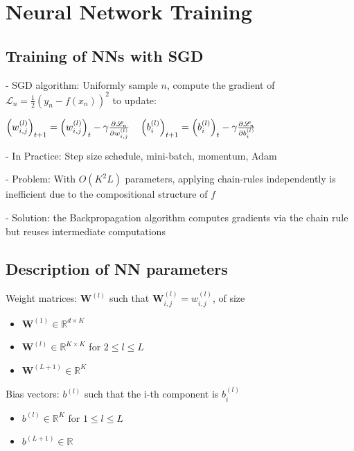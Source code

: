 
\section*{Neural Network Training}

\subsection*{Training of NNs with SGD}
- SGD algorithm: Uniformly sample $n$, compute the gradient of $\mathscr{L}_{n}=\frac{1}{2}\left(y_{n}-f\left(x_{n}\right)\right)^{2}$ to update:

$
\left(w_{i, j}^{(l)}\right)_{t+1}=\left(w_{i, j}^{(l)}\right)_{t}-\gamma \frac{\partial \mathscr{L}_{n}}{\partial w_{i, j}^{(l)}} \\\quad\left(b_{i}^{(l)}\right)_{t+1}=\left(b_{i}^{(l)}\right)_{t}-\gamma \frac{\partial \mathscr{L}_{n}}{\partial b_{i}^{(l)}}
$

- In Practice: Step size schedule, mini-batch, momentum, Adam

- Problem: With $O\left(K^{2} L\right)$ parameters, applying chain-rules independently is inefficient due to the compositional structure of $f$

- Solution: the Backpropagation algorithm computes gradients via the chain rule but reuses intermediate computations

\subsection*{Description of NN parameters}


Weight matrices: $\mathbf{W}^{(l)}$ such that $\mathbf{W}_{i, j}^{(l)}=w_{i, j}^{(l)}$, of size

\begin{itemize}
  \item $\mathbf{W}^{(1)} \in \mathbb{R}^{d \times K}$
  \item $\mathbf{W}^{(l)} \in \mathbb{R}^{K \times K}$ for $2 \leq l \leq L$
  \item $\mathbf{W}^{(L+1)} \in \mathbb{R}^{K}$
\end{itemize}

Bias vectors: $b^{(l)}$ such that the i-th component is $b_{i}^{(l)}$

\begin{itemize}
  \item $b^{(l)} \in \mathbb{R}^{K}$ for $1 \leq l \leq L$
  \item $b^{(L+1)} \in \mathbb{R}$
\end{itemize}

